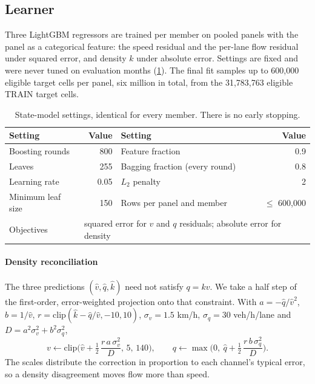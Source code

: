 \subsection{Learner}
Three LightGBM \cite{ke2017} regressors are trained per member on pooled panels with the panel as a categorical
feature: the speed residual and the per-lane flow residual under squared error, and density $k$ under absolute
error. Settings are fixed and were never tuned on evaluation months (\cref{tab:hyper}). The final fit samples up to
600,000 eligible target cells per panel, six million in total, from the 31,783,763 eligible TRAIN target cells.

\begin{table}[h]
\centering\small
\caption{State-model settings, identical for every member. There is no early stopping.}\label{tab:hyper}
\begin{tabular}{@{}l r l r@{}}
\toprule
Setting & Value & Setting & Value \\
\midrule
Boosting rounds & 800 & Feature fraction & 0.9 \\
Leaves & 255 & Bagging fraction (every round) & 0.8 \\
Learning rate & 0.05 & $L_2$ penalty & 2 \\
Minimum leaf size & 150 & Rows per panel and member & $\le$ 600,000 \\
Objectives & \multicolumn{3}{l}{squared error for $v$ and $q$ residuals; absolute error for density} \\
\bottomrule
\end{tabular}
\end{table}

\paragraph{Density reconciliation} The three predictions $(\hat v,\hat q,\hat k)$ need not satisfy $q=kv$. We take a
half step of the first-order, error-weighted projection onto that constraint. With $a=-\hat q/\hat v^2$, $b=1/\hat v$,
$r=\mathrm{clip}(\hat k-\hat q/\hat v,-10,10)$, $\sigma_v=1.5$ km/h, $\sigma_q=30$ veh/h/lane and
$D=a^2\sigma_v^2+b^2\sigma_q^2$,
\begin{equation}
  v \leftarrow \mathrm{clip}\Big(\hat v + \tfrac12\,\frac{r\,a\,\sigma_v^2}{D},\,5,\,140\Big),\qquad
  q \leftarrow \max\Big(0,\ \hat q + \tfrac12\,\frac{r\,b\,\sigma_q^2}{D}\Big).
  \label{eq:density}
\end{equation}
The scales distribute the correction in proportion to each channel's typical error, so a density disagreement
moves flow more than speed.

